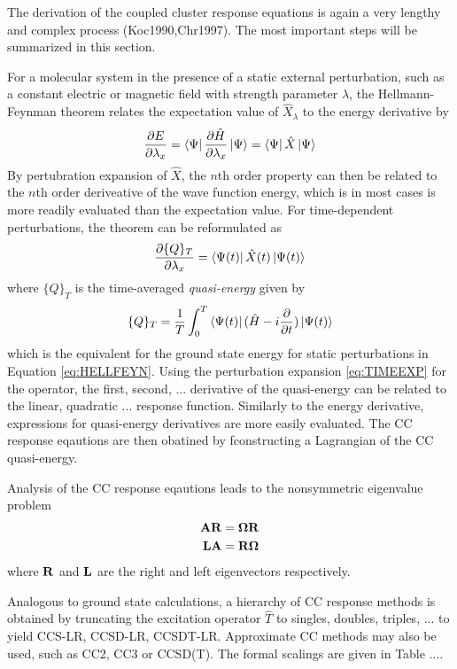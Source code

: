 The derivation of the coupled cluster response equations is again a very lengthy and complex process (Koc1990,Chr1997). The most important steps will be summarized in this section.

For a molecular system in the presence of a static external perturbation, such as a constant electric or magnetic field with strength parameter $\lambda$, the Hellmann-Feynman theorem relates the expectation value of $\hat{X}_{\lambda}$ to the energy derivative by
\begin{equation}
\frac{\partial E}{\partial \lambda_x} = \bra{\smash{\Psi}}\frac{\partial \hat{H}}{\partial \lambda_x} \ket{\smash{\Psi}} = \bra{\smash{\Psi}}\hat{X} \ket{\smash{\Psi}}
\label{eq:HELLFEYN}
\end{equation}
\noindent By pertubration expansion of $\hat{X}$, the $n$th order property can then be related to the $n$th order deriveative of the wave function energy, which is in most cases is more readily evaluated than the expectation value. For time-dependent perturbations, the theorem can be reformulated as 
\begin{equation}
\frac{\partial \{Q\}_T}{\partial \lambda_x} = \bra{\smash{\Psi(t)}} \hat{X}(t) \ket{\smash{\Psi(t)}} 
\end{equation}
\noindent where $\{Q\}_T$ is the time-averaged \emph{quasi-energy} given by
\begin{equation}
\{Q\}_T = \frac{1}{T} \int_0^T \bra{\smash{\Psi(t)}} (\hat{H} - i\frac{\partial}{\partial t})\ket{\smash{\Psi(t)}}
\label{eq:HELLFEYN2}
\end{equation}
\noindent which is the equivalent for the ground state energy for static perturbations in Equation \ref{eq:HELLFEYN}. Using the perturbation expansion \ref{eq:TIMEEXP} for the operator, the first, second, ... derivative of the quasi-energy can be related to the linear, quadratic ... response function. Similarly to the energy derivative, expressions for quasi-energy derivatives are more easily evaluated. The CC response eqautions are then obatined by fconstructing a Lagrangian of the CC quasi-energy. 

Analysis of the CC response eqautions leads to the nonsymmetric eigenvalue problem
\begin{align}
\mathbf{A}\mathbf{R} &= \mathbf{\Omega}\mathbf{R} \\
\mathbf{L}\mathbf{A} &= \mathbf{R}\mathbf{\Omega} 
\end{align} 
\noindent where $\mathbf{R}$ and $\mathbf{L}$ are the right and left eigenvectors respectively.

Analogous to ground state calculations, a hierarchy of CC response methods is obtained by truncating the excitation operator $\hat{T}$ to singles, doubles, triples, ... to yield CCS-LR, CCSD-LR, CCSDT-LR. Approximate CC methods may also be used, such as CC2, CC3 or CCSD(T). The formal scalings are given in Table ....

